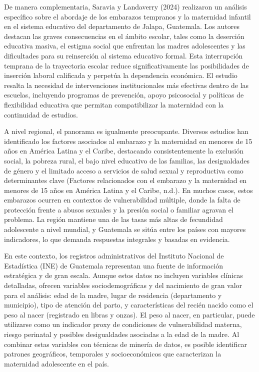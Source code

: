\documentclass[
]{article}
\begin{document}
De manera complementaria, Saravia y Landaverry (2024) realizaron un
análisis específico sobre el abordaje de los embarazos tempranos y la
maternidad infantil en el sistema educativo del departamento de Jalapa,
Guatemala. Los autores destacan las graves consecuencias en el ámbito
escolar, tales como la deserción educativa masiva, el estigma social que
enfrentan las madres adolescentes y las dificultades para su reinserción
al sistema educativo formal. Esta interrupción temprana de la
trayectoria escolar reduce significativamente las posibilidades de
inserción laboral calificada y perpetúa la dependencia económica. El
estudio resalta la necesidad de intervenciones institucionales más
efectivas dentro de las escuelas, incluyendo programas de prevención,
apoyo psicosocial y políticas de flexibilidad educativa que permitan
compatibilizar la maternidad con la continuidad de estudios.

A nivel regional, el panorama es igualmente preocupante. Diversos
estudios han identificado los factores asociados al embarazo y la
maternidad en menores de 15 años en América Latina y el Caribe,
destacando consistentemente la exclusión social, la pobreza rural, el
bajo nivel educativo de las familias, las desigualdades de género y el
limitado acceso a servicios de salud sexual y reproductiva como
determinantes clave (Factores relacionados con el embarazo y la
maternidad en menores de 15 años en América Latina y el Caribe, n.d.).
En muchos casos, estos embarazos ocurren en contextos de vulnerabilidad
múltiple, donde la falta de protección frente a abusos sexuales y la
presión social o familiar agravan el problema. La región mantiene una de
las tasas más altas de fecundidad adolescente a nivel mundial, y
Guatemala se sitúa entre los países con mayores indicadores, lo que
demanda respuestas integrales y basadas en evidencia.

En este contexto, los registros administrativos del Instituto Nacional
de Estadística (INE) de Guatemala representan una fuente de información
estratégica y de gran escala. Aunque estos datos no incluyen variables
clínicas detalladas, ofrecen variables sociodemográficas y del
nacimiento de gran valor para el análisis: edad de la madre, lugar de
residencia (departamento y municipio), tipo de atención del parto, y
características del recién nacido como el peso al nacer (registrado en
libras y onzas). El peso al nacer, en particular, puede utilizarse como
un indicador proxy de condiciones de vulnerabilidad materna, riesgo
perinatal y posibles desigualdades asociadas a la edad de la madre. Al
combinar estas variables con técnicas de minería de datos, es posible
identificar patrones geográficos, temporales y socioeconómicos que
caracterizan la maternidad adolescente en el país.
\end{document}
